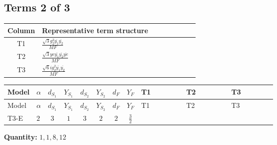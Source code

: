 \documentclass[8pt]{article}
\begin{document}
\begin{landscape}
\subsection*{Terms 2 of 3}
\begin{center}
\begin{tabular}{@{}c >{\raggedright\arraybackslash}p{0.82\linewidth}@{}}
\toprule
Column & Representative term structure \\
\midrule
T1 & \(\displaystyle \frac{\sqrt{3} g_{2}^{2} \overline{y_{1}} \overline{y_{2}}}{MF}\) \\
\midrule
T2 & \(\displaystyle \frac{\sqrt{3} ye \overline{y_{1}} \overline{y_{2}} \overline{ye}}{MF}\) \\
\midrule
T3 & \(\displaystyle \frac{\sqrt{6} i g_{2}^{2} \overline{y_{1}} \overline{y_{2}}}{MF}\) \\
\midrule
\bottomrule
\end{tabular}
\end{center}
\smallskip
\tiny
\begin{longtable}{@{}llcccccc >{\raggedright\arraybackslash}p{0.21\linewidth} >{\raggedright\arraybackslash}p{0.21\linewidth} >{\raggedright\arraybackslash}p{0.21\linewidth}@{}}
\toprule
Model & $\alpha$ & $d_{S_1}$ & $Y_{S_1}$ & $d_{S_2}$ & $Y_{S_2}$ & $d_F$ & $Y_F$ & T1 & T2 & T3 \\
\midrule
\endfirsthead
\toprule
Model & $\alpha$ & $d_{S_1}$ & $Y_{S_1}$ & $d_{S_2}$ & $Y_{S_2}$ & $d_F$ & $Y_F$ & T1 & T2 & T3 \\
\midrule
\endhead
T3-E & $2$ & $3$ & $1$ & $3$ & $2$ & $2$ & $\frac{3}{2}$ & \scriptsize\adjustbox{max width=\linewidth}{$\begin{gathered} \frac{49 \sqrt{3} g_{2}^{2} \overline{y_{1}} \overline{y_{2}}}{24 MF}\end{gathered}$} & \scriptsize\adjustbox{max width=\linewidth}{$\begin{gathered} - \frac{\sqrt{3} ye \overline{y_{1}} \overline{y_{2}} \overline{ye}}{12 MF}\end{gathered}$} & \scriptsize\adjustbox{max width=\linewidth}{$\begin{gathered} \frac{\sqrt{6} i g_{2}^{2} \overline{y_{1}} \overline{y_{2}}}{3 MF}\end{gathered}$} \\
\midrule
\bottomrule
\end{longtable}
\clearpage
\noindent\textbf{Quantity: }$\mathrm{1,1,8,12}$\par\smallskip

\end{landscape}
\end{document}
